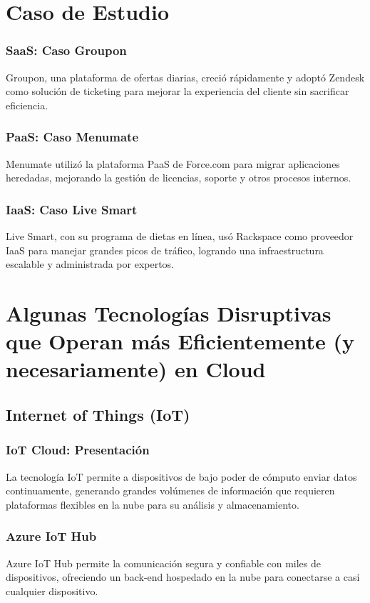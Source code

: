 \documentclass{article}
\begin{document}
\section{Caso de Estudio}
\subsubsection*{SaaS: Caso Groupon}
Groupon, una plataforma de ofertas diarias, creció rápidamente y adoptó Zendesk como solución de ticketing para mejorar la experiencia del cliente sin sacrificar eficiencia.

\subsubsection*{PaaS: Caso Menumate}
Menumate utilizó la plataforma PaaS de Force.com para migrar aplicaciones heredadas, mejorando la gestión de licencias, soporte y otros procesos internos.

\subsubsection*{IaaS: Caso Live Smart}
Live Smart, con su programa de dietas en línea, usó Rackspace como proveedor IaaS para manejar grandes picos de tráfico, logrando una infraestructura escalable y administrada por expertos.

\section{Algunas Tecnologías Disruptivas que Operan más Eficientemente
(y necesariamente) en Cloud}
\subsection{Internet of Things (IoT)}

\subsubsection{IoT Cloud: Presentación}
La tecnología IoT permite a dispositivos de bajo poder de cómputo enviar datos continuamente, generando grandes volúmenes de información que requieren plataformas flexibles en la nube para su análisis y almacenamiento.

\subsubsection{Azure IoT Hub}
Azure IoT Hub permite la comunicación segura y confiable con miles de dispositivos, ofreciendo un back-end hospedado en la nube para conectarse a casi cualquier dispositivo.
\end{document}
